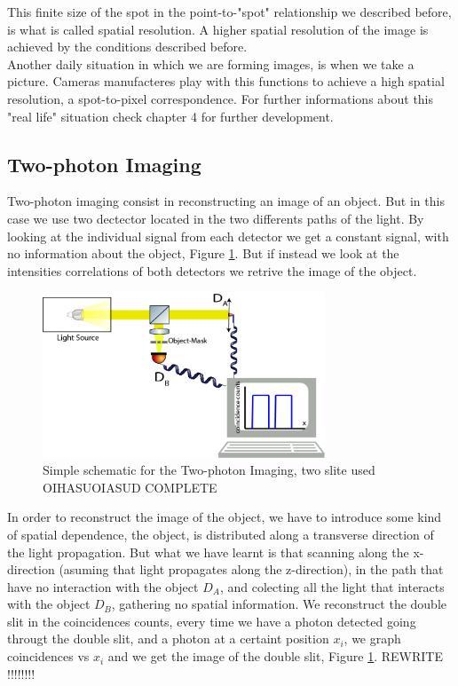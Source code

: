 This finite size of the spot in the point-to-"spot" relationship we described before, is what is called 
spatial resolution. A higher spatial resolution of the image is achieved by the conditions described before. \\

Another daily situation in which we are forming images, is when we take a picture. Cameras manufacteres play 
with this functions to achieve a high spatial resolution, a spot-to-pixel correspondence.
For further informations about this "real life" situation check\cite{introquantumoptics} chapter 4 for further development.



\subsection{Two-photon Imaging}\label{twoPhotonImaging}

Two-photon imaging consist in reconstructing an image of an object. 
But in this case we use two dectector located in the two differents paths of the light. 
By looking at the individual signal from each detector
 we get a constant signal, with no information 
about the object, Figure \ref{fig:twoPhotonSetup}. But 
if instead we look at the intensities correlations of both 
detectors we retrive the image of the object.
 \\


\begin{figure}[h]
\centering
\includegraphics[width=0.75\textwidth]{Figures/twoPhotonSetup.png}
\caption{Simple schematic for the Two-photon Imaging, two slite used OIHASUOIASUD COMPLETE} 
\label{fig:twoPhotonSetup}
\end{figure}

In order to reconstruct the image of the object, we have to introduce some kind of spatial 
dependence, the object, is distributed along a transverse direction 
of the light propagation. But what we have learnt is that scanning along the x-direction 
(asuming that light propagates along the z-direction), in the path that have no interaction 
with the object $D_A$, and colecting all the light that interacts with the object $D_B$, 
gathering no spatial information. We reconstruct the double slit in the coincidences counts, 
every time we have a photon detected going througt the double slit, and a photon at a certaint 
position $x_i$, we graph coincidences vs ${ x_i }$ and we get
 the image of the double slit, Figure \ref{fig:twoPhotonSetup}. REWRITE !!!!!!!! 




